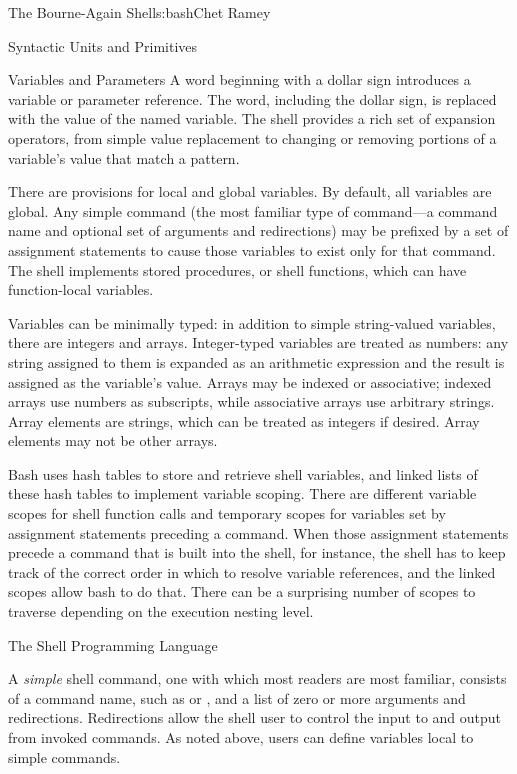 \begin{aosachapter}{The Bourne-Again Shell}{s:bash}{Chet Ramey}
\begin{aosasect1}{Syntactic Units and Primitives}
\begin{aosasect2}{Variables and Parameters}
A word beginning with a dollar sign introduces a variable or parameter
reference.  The word, including the dollar sign, is replaced with the
value of the named variable.  The shell provides a rich set of
expansion operators, from simple value replacement to changing or
removing portions of a variable's value that match a pattern.

There are provisions for local and global variables.  By default, all
variables are global.  Any simple command (the most familiar type of
command---a command name and optional set of arguments and
redirections) may be prefixed by a set of assignment statements to
cause those variables to exist only for that command.  The shell
implements stored procedures, or shell functions, which can have
function-local variables.

Variables can be minimally typed: in addition to simple string-valued
variables, there are integers and arrays.  Integer-typed variables are
treated as numbers: any string assigned to them is expanded as an
arithmetic expression and the result is assigned as the variable's
value.  Arrays may be indexed or associative; indexed arrays use
numbers as subscripts, while associative arrays use arbitrary strings.
Array elements are strings, which can be treated as integers if
desired.  Array elements may not be other arrays.

Bash uses hash tables to store and retrieve shell variables, and
linked lists of these hash tables to implement variable scoping.
There are different variable scopes for shell function calls and
temporary scopes for variables set by assignment statements preceding
a command.  When those assignment statements precede a command that is
built into the shell, for instance, the shell has to keep track of the
correct order in which to resolve variable references, and the linked
scopes allow bash to do that.  There can be a surprising number of
scopes to traverse depending on the execution nesting level.

\end{aosasect2}

\begin{aosasect2}{The Shell Programming Language}

A \emph{simple} shell command, one with which most readers are most
familiar, consists of a command name, such as  or
, and a list of zero or more arguments and redirections.
Redirections allow the shell user to control the input to and output
from invoked commands.  As noted above, users can define variables
local to simple commands.


\end{aosasect2}
\end{aosasect1}
\end{aosachapter}
